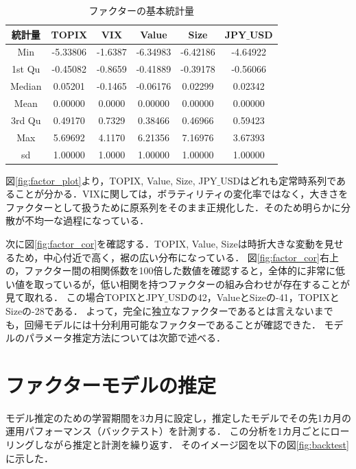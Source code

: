 ﻿\documentclass[11pt]{jreport}
\begin{document}
\begin{table}[H]
\caption{ファクターの基本統計量}
\begin{center}
\begin{tabular}{|c|c|c|c|c|c|}
\hline
統計量 & TOPIX & VIX & Value & Size & JPY$\_$USD\\
\hline
\hline
 Min		&-5.33806&-1.6387&-6.34983&-6.42186&-4.64922\\
 1st Qu	&-0.45082&-0.8659&-0.41889&-0.39178&-0.56066 \\
 Median	&0.05201&-0.1465&-0.06176&0.02299 &0.02342 \\
 Mean		&0.00000&0.0000&0.00000&0.00000&0.00000\\
 3rd Qu 	&0.49170&0.7329&0.38466&0.46966&0.59423\\
 Max		&5.69692&4.1170&6.21356&7.16976&3.67393 \\
\hline
 sd 		&1.00000&1.0000&1.00000&1.00000&1.00000\\

\hline
\end{tabular}
\end{center}
\label{tbl:factor_summary}
\end{table}


図\ref{fig:factor_plot}より，TOPIX, Value, Size, JPY$\_$USDはどれも定常時系列であることが分かる．VIXに関しては，ボラティリティの変化率ではなく，大きさをファクターとして扱うために原系列をそのまま正規化した．そのため明らかに分散が不均一な過程になっている．

次に図\ref{fig:factor_cor}を確認する．TOPIX, Value, Sizeは時折大きな変動を見せるため，中心付近で高く，裾の広い分布になっている．
図\ref{fig:factor_cor}右上の，ファクター間の相関係数を100倍した数値を確認すると，全体的に非常に低い値を取っているが，低い相関を持つファクターの組み合わせが存在することが見て取れる．
この場合TOPIXとJPY$\_$USDの42，ValueとSizeの-41，TOPIXとSizeの-28である．
よって，完全に独立なファクターであるとは言えないまでも，回帰モデルには十分利用可能なファクターであることが確認できた．
モデルのパラメータ推定方法については次節で述べる．


\section{ファクターモデルの推定}
モデル推定のための学習期間を3カ月に設定し，推定したモデルでその先1カ月の運用パフォーマンス（バックテスト）を計測する．
この分析を1カ月ごとにローリングしながら推定と計測を繰り返す．
そのイメージ図を以下の図\ref{fig:backtest}に示した．
\end{document}
